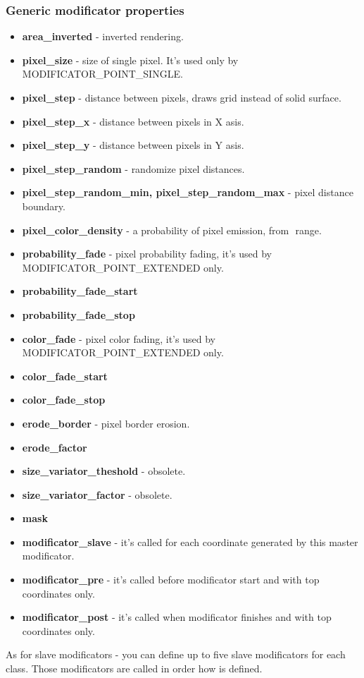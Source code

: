 \documentclass[9pt]{article}
\begin{document}
\subsubsection*{Generic modificator properties}
\begin{itemize}
\item{\bf area\_inverted} - inverted rendering.
\item{\bf pixel\_size} - size of single pixel. It's used only by MODIFICATOR\_POINT\_SINGLE.
\item{\bf pixel\_step} - distance between pixels, draws grid instead of solid surface.
\item{\bf pixel\_step\_x} - distance between pixels in X asis.
\item{\bf pixel\_step\_y} - distance between pixels in Y asis.
\item{\bf pixel\_step\_random} - randomize pixel distances.
\item{\bf pixel\_step\_random\_min, pixel\_step\_random\_max} - pixel distance boundary. 
\item{\bf pixel\_color\_density} - a probability of pixel emission, from
\begin{math}<0,1>\end{math} range.
\item{\bf probability\_fade} - pixel probability fading, it's used by MODIFICATOR\_POINT\_EXTENDED only.
\item{\bf probability\_fade\_start}
\item{\bf probability\_fade\_stop}
\item{\bf color\_fade} - pixel color fading, it's used by MODIFICATOR\_POINT\_EXTENDED only.
\item{\bf color\_fade\_start}
\item{\bf color\_fade\_stop}
\item{\bf erode\_border} - pixel border erosion.
\item{\bf erode\_factor}
\item{\bf size\_variator\_theshold} - obsolete.
\item{\bf size\_variator\_factor} - obsolete.
\item{\bf mask}
\end{itemize}
\begin{itemize}
\item{\bf modificator\_slave} - it's called for each coordinate generated 
by this master modificator.
\item{\bf modificator\_pre} - it's called before modificator start 
and with top coordinates only.
\item{\bf modificator\_post} - it's called when modificator finishes 
and with top coordinates only.
\end{itemize}
As for slave modificators - you can define up to five slave modificators for each class.
Those modificators are called in order how is defined.
\end{document}
